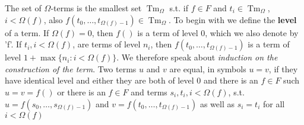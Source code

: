 \documentclass[11pt]{article}
\DeclareMathOperator{\Tm}{Tm}
\begin{document}
The set of \(\Omega\)-terms is the smallest set \(\Tm_\Omega\) s.t. if \(f\in
   F\) and \(t_i\in\Tm_\Omega\), \(i<\Omega(f)\), also
\(f(t_0,\dots,t_{\Omega(f)-1})\in\Tm_\Omega\). To begin with we define the \textbf{level}
of a term. If \(\Omega(f)=0\), then \(f()\) is a term of level 0, which we also
denote by 'f'. If \(t_i,i<\Omega(f)\), are terms of level \(n_i\), then
\(f(t_0,\dots,t_{\Omega(f)-1})\) is a term of level \(1+\max\{n_i:i<\Omega(f)\}\).
We therefore speak about \emph{induction on the construction of the term}. Two terms
\(u\) and \(v\) are equal, in symbols \(u=v\), if they have identical level and
either they are both of level 0 and there is an \(f\in F\) such \(u=v=f()\)
or there is an \(f\in F\) and terms \(s_i,t_i,i<\Omega(f)\), s.t.
\(u=f(s_0,\dots,s_{\Omega(f)-1})\) and \(v=f(t_0,\dots,t_{\Omega(f)-1})\) as well as
\(s_i=t_i\) for all \(i<\Omega(f)\)
\end{document}

